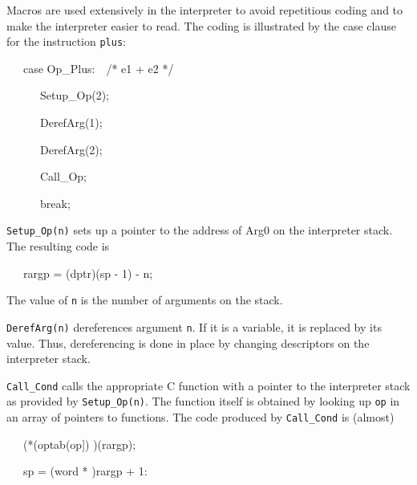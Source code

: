Macros are used extensively in the interpreter to avoid repetitious
coding and to make the interpreter easier to read.  The coding is
illustrated by the case clause for the instruction \texttt{plus}:

{\ttfamily\mdseries
\ \ \ case Op\_Plus:\ \ /* e1 + e2 */}

{\ttfamily\mdseries
\ \ \ \ \ \ Setup\_Op(2);}

{\ttfamily\mdseries
\ \ \ \ \ \ DerefArg(1);}

{\ttfamily\mdseries
\ \ \ \ \ \ DerefArg(2);}

{\ttfamily\mdseries
\ \ \ \ \ \ Call\_Op;}

{\ttfamily\mdseries
\ \ \ \ \ \ break;}


\texttt{Setup\_Op(n)} sets up a pointer to the address of Arg0 on the
interpreter stack. The resulting code is

{\ttfamily\mdseries
\ \ \ rargp = (dptr)(sp - 1) - n;}

The value of \texttt{n} is the number of arguments on the stack.

\texttt{DerefArg(n)} dereferences argument \texttt{n}. If it is a
variable, it is replaced by its value. Thus, dereferencing is done in
place by changing descriptors on the interpreter stack.

\texttt{Call\_Cond} calls the appropriate C function with a pointer to
the interpreter stack as provided by \texttt{Setup\_Op(n)}. The
function itself is obtained by looking up \texttt{op} in an array of
pointers to functions.  The code produced by \texttt{Call\_Cond} is
(almost)

{\ttfamily\mdseries
\ \ \ (*(optab(op]) )(rargp);}

{\ttfamily\mdseries
\ \ \ sp = (word * )rargp + 1:}


\bigskip

